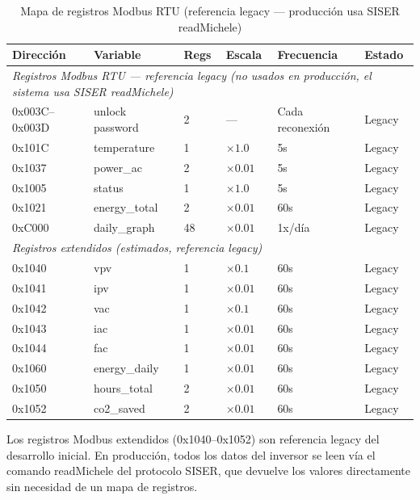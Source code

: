 \documentclass[12pt,a4paper]{article}
\begin{document}
\begin{table}[H]
\centering
\begin{tabular}{llllll}
\toprule
\textbf{Direcci\'on} & \textbf{Variable} & \textbf{Regs} & \textbf{Escala} & \textbf{Frecuencia} & \textbf{Estado} \\
\midrule
\multicolumn{6}{l}{\textit{Registros Modbus RTU --- referencia legacy (no usados en producci\'on, el sistema usa SISER readMichele)}} \\
0x003C--0x003D & unlock password & 2 & --- & Cada reconexi\'on & Legacy \\
0x101C & temperature & 1 & $\times 1.0$ & 5s & Legacy \\
0x1037 & power\_ac & 2 & $\times 0.01$ & 5s & Legacy \\
0x1005 & status & 1 & $\times 1.0$ & 5s & Legacy \\
0x1021 & energy\_total & 2 & $\times 0.01$ & 60s & Legacy \\
0xC000 & daily\_graph & 48 & $\times 0.01$ & 1x/d\'ia & Legacy \\
\midrule
\multicolumn{6}{l}{\textit{Registros extendidos (estimados, referencia legacy)}} \\
0x1040 & vpv & 1 & $\times 0.1$ & 60s & Legacy \\
0x1041 & ipv & 1 & $\times 0.01$ & 60s & Legacy \\
0x1042 & vac & 1 & $\times 0.1$ & 60s & Legacy \\
0x1043 & iac & 1 & $\times 0.01$ & 60s & Legacy \\
0x1044 & fac & 1 & $\times 0.01$ & 60s & Legacy \\
0x1060 & energy\_daily & 1 & $\times 0.01$ & 60s & Legacy \\
0x1050 & hours\_total & 2 & $\times 0.01$ & 60s & Legacy \\
0x1052 & co2\_saved & 2 & $\times 0.01$ & 60s & Legacy \\
\bottomrule
\end{tabular}
\caption{Mapa de registros Modbus RTU (referencia legacy --- producci\'on usa SISER readMichele)}
\label{tab:registers-legacy}
\end{table}

\begin{notebox}
Los registros Modbus extendidos (0x1040--0x1052) son referencia legacy del desarrollo inicial. En producci\'on, todos los datos del inversor se leen v\'ia el comando readMichele del protocolo SISER, que devuelve los valores directamente sin necesidad de un mapa de registros.
\end{notebox}
\end{document}
